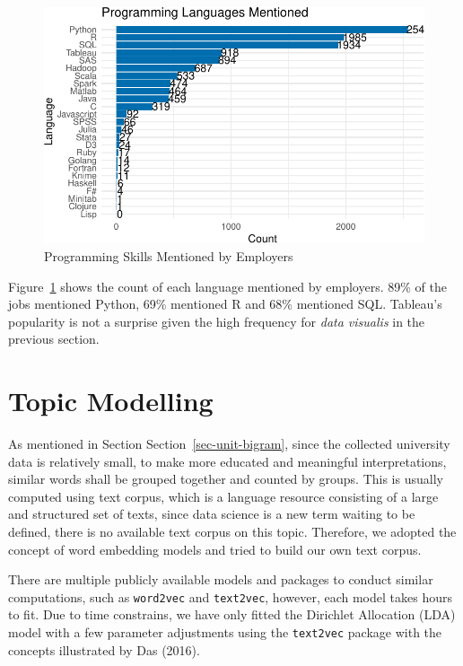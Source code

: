 \documentclass[
  letterpaper,
]{report}
\begin{document}
\begin{figure}

{\centering \includegraphics{./03_3-jobtext_files/figure-pdf/fig-languages-1.pdf}

}

\caption{\label{fig-languages}Programming Skills Mentioned by Employers}

\end{figure}

Figure~\ref{fig-languages} shows the count of each language mentioned by
employers. 89\% of the jobs mentioned Python, 69\% mentioned R and 68\%
mentioned SQL. Tableau's popularity is not a surprise given the high
frequency for \emph{data visualis} in the previous section.

\part{Topic Modelling}

As mentioned in Section Section~\ref{sec-unit-bigram}, since the
collected university data is relatively small, to make more educated and
meaningful interpretations, similar words shall be grouped together and
counted by groups. This is usually computed using text corpus, which is
a language resource consisting of a large and structured set of texts,
since data science is a new term waiting to be defined, there is no
available text corpus on this topic. Therefore, we adopted the concept
of word embedding models and tried to build our own text corpus.

There are multiple publicly available models and packages to conduct
similar computations, such as \texttt{word2vec} and \texttt{text2vec},
however, each model takes hours to fit. Due to time constrains, we have
only fitted the Dirichlet Allocation (LDA) model with a few parameter
adjustments using the \texttt{text2vec} package with the concepts
illustrated by Das (2016).
\end{document}
